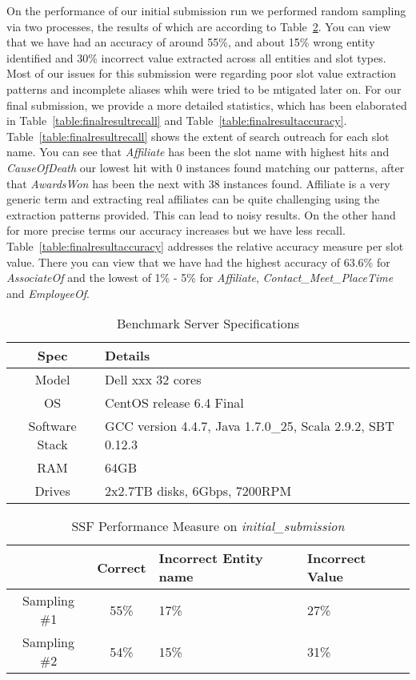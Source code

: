 On the performance of our initial submission run we performed random sampling via two processes, the results of which are according to Table~\ref{table:initialresult}. You can view that we have had an accuracy of around 55\%, and about 15\% wrong entity identified and 30\% incorrect value extracted across all entities and slot types. Most of our issues for this submission were regarding poor slot value extraction patterns and incomplete aliases whih were tried to be mtigated later on. For our final submission, we provide a more detailed statistics, which has been elaborated in Table~\ref{table:finalresultrecall} and Table~\ref{table:finalresultaccuracy}. Table~\ref{table:finalresultrecall} shows the extent of search outreach for
each slot name. You can see that \textit{Affiliate} has been the slot name with highest hits and \textit{CauseOfDeath} our lowest hit with 0 instances found matching our patterns, after that \textit{AwardsWon} has been the next with 38 instances found. Affiliate is a very generic term and extracting real affiliates can be quite challenging using the extraction patterns provided. This can lead to noisy results. On the other hand for more precise terms our accuracy increases but we have less recall. Table~\ref{table:finalresultaccuracy} addresses the relative accuracy measure per slot value. There you can view that we have had the highest accuracy of 63.6\% for \textit{AssociateOf} and the lowest of 1\% - 5\%  for \textit{Affiliate}, \textit{Contact\_Meet\_PlaceTime} and \textit{EmployeeOf}.

\begin{table}
\caption{Benchmark Server Specifications }
\centering
\label{table:serverspec}
\begin{tabular}{| c | p{5cm} |}
\hline 
\textbf{Spec} & \textbf{Details} \\ \hline
Model & Dell xxx 32 cores \\ \hline 
OS & CentOS release 6.4 Final \\ \hline 
Software Stack & GCC version 4.4.7, Java 1.7.0\_25, Scala 2.9.2, SBT 0.12.3 \\ \hline 
 RAM & 64GB\\ \hline 
 Drives & 2x2.7TB disks, 6Gbps, 7200RPM\\ \hline 
\end{tabular} 
\end{table}







\begin{table}
\caption{SSF Performance Measure on \textit{initial\_submission} }
\centering
\label{table:initialresult}

\begin{tabular}{ | c | c | p{2cm} | p{13mm} |}
\hline 
 & \textbf{Correct} & \textbf{Incorrect Entity name} & \textbf{Incorrect Value} \\ 
\hline 
Sampling \#1 & 55\% & 17\% & 27\% \\ 
\hline Sampling \#2 & 54\% & 15\% & 31\%  \\ 
\hline 
\end{tabular} 
\end{table}

